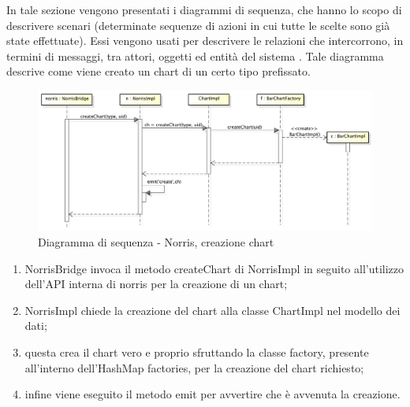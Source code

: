     	In tale sezione vengono presentati i diagrammi di sequenza, che hanno lo scopo di descrivere scenari (determinate sequenze di azioni in cui tutte le scelte sono già state effettuate). Essi vengono usati per descrivere le relazioni che intercorrono, in termini di messaggi, tra attori, oggetti ed entità del sistema .
        	Tale diagramma descrive come viene creato un chart di un certo tipo prefissato.
            \begin{figure}[H]
                \centering
                \includegraphics[scale=0.3]{DefinizioneDiProdotto/Pics/NorrisCreazioneChart}
                \caption{Diagramma di sequenza - Norris, creazione chart}
            \end{figure}
            \begin{enumerate}
                \item NorrisBridge invoca il metodo createChart di NorrisImpl in seguito all'utilizzo dell'API interna di norris per la creazione di un chart;
                \item NorrisImpl chiede la creazione del chart alla classe ChartImpl nel modello dei dati;
                \item questa crea il chart vero e proprio sfruttando la classe factory, presente all'interno dell'HashMap factories, per la creazione del chart richiesto;
                \item infine viene eseguito il metodo emit per avvertire che è avvenuta la creazione.
            \end{enumerate}


